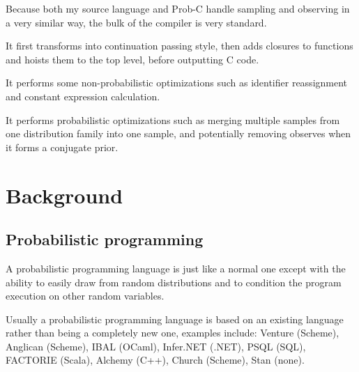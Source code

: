 \documentclass[a4paper]{article}
\begin{document}
Because both my source language and Prob-C handle sampling and observing in a very similar way, the bulk of the compiler is very standard.

It first transforms into continuation passing style, then adds closures to functions and hoists them to the top level, before outputting C code.

It performs some non-probabilistic optimizations such as identifier reassignment and constant expression calculation.

It performs probabilistic optimizations such as merging multiple samples from one distribution family into one sample, and potentially removing observes when it forms a conjugate prior.




\section{Background}




\subsection{Probabilistic programming}

A probabilistic programming language is just like a normal one except with the ability to easily draw from random distributions and to condition the program execution on other random variables.

Usually a probabilistic programming language is based on an existing language rather than being a completely new one, examples include: Venture (Scheme), Anglican (Scheme), IBAL (OCaml), Infer.NET (.NET), PSQL (SQL), FACTORIE (Scala), Alchemy (C++), Church (Scheme), Stan (none).
\end{document}
